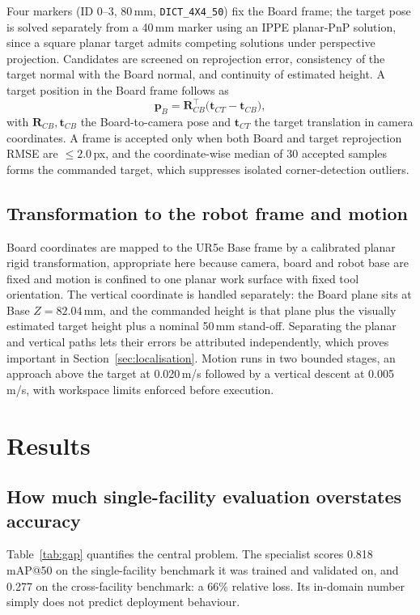 \documentclass[conference]{IEEEtran}
\begin{document}
Four markers (ID 0--3, 80\,mm, \texttt{DICT\_4X4\_50}) fix the Board frame; the
target pose is solved separately from a 40\,mm marker using an IPPE planar-PnP
solution, since a square planar target admits competing solutions under perspective
projection. Candidates are screened on reprojection error, consistency of the target
normal with the Board normal, and continuity of estimated height. A target position
in the Board frame follows as
\begin{equation}
\mathbf{p}_B=\mathbf{R}_{CB}^{\top}\bigl(\mathbf{t}_{CT}-\mathbf{t}_{CB}\bigr),
\end{equation}
with $\mathbf{R}_{CB},\mathbf{t}_{CB}$ the Board-to-camera pose and $\mathbf{t}_{CT}$
the target translation in camera coordinates. A frame is accepted only when both
Board and target reprojection RMSE are $\leq 2.0$\,px, and the coordinate-wise median
of 30 accepted samples forms the commanded target, which suppresses isolated
corner-detection outliers.

\subsection{Transformation to the robot frame and motion}
Board coordinates are mapped to the UR5e Base frame by a calibrated planar rigid
transformation, appropriate here because camera, board and robot base are fixed and
motion is confined to one planar work surface with fixed tool orientation. The
vertical coordinate is handled separately: the Board plane sits at Base
$Z=82.04$\,mm, and the commanded height is that plane plus the visually estimated
target height plus a nominal 50\,mm stand-off. Separating the planar and vertical
paths lets their errors be attributed independently, which proves important in
Section~\ref{sec:localisation}. Motion runs in two bounded stages, an approach above
the target at 0.020\,m/s followed by a vertical descent at 0.005\,m/s, with workspace
limits enforced before execution.

\section{Results}

\subsection{How much single-facility evaluation overstates accuracy}
\label{sec:gap}

Table~\ref{tab:gap} quantifies the central problem. The
specialist scores 0.818 mAP@50 on the single-facility benchmark it was trained and
validated on, and 0.277 on the cross-facility benchmark: a 66\% relative loss. Its
in-domain number simply does not predict deployment behaviour.
\end{document}

